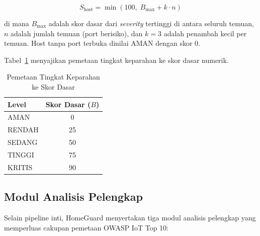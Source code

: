 \documentclass[conference]{IEEEtran}
\begin{document}
\begin{equation}
S_{\text{host}} = \min\left(100,\; B_{\max} + k \cdot n\right)
\label{eq:skor}
\end{equation}

\noindent di mana $B_{\max}$ adalah skor dasar dari \textit{severity} tertinggi di antara seluruh temuan, $n$ adalah jumlah temuan (port berisiko), dan $k = 3$ adalah penambah kecil per temuan. Host tanpa port terbuka dinilai AMAN dengan skor 0.

Tabel\ \ref{tab:severity} menyajikan pemetaan tingkat keparahan ke skor dasar numerik.

\begin{table}[htbp]
\caption{Pemetaan Tingkat Keparahan ke Skor Dasar}
\label{tab:severity}
\renewcommand{\arraystretch}{1.2}
\begin{tabular}{|l|c|}
\hline
\textbf{Level} & \textbf{Skor Dasar ($B$)} \\
\hline
AMAN & 0 \\
\hline
RENDAH & 25 \\
\hline
SEDANG & 50 \\
\hline
TINGGI & 75 \\
\hline
KRITIS & 90 \\
\hline
\end{tabular}
\end{table}

\subsection{Modul Analisis Pelengkap}

Selain pipeline inti, HomeGuard menyertakan tiga modul analisis pelengkap yang memperluas cakupan pemetaan OWASP IoT Top 10:
\end{document}
